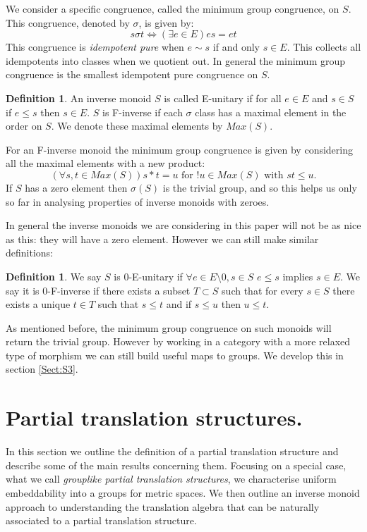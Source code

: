 \documentclass[11pt]{amsart}
\theoremstyle{plain}
\theoremstyle{definition}%
\newtheorem{definition}[theorem]{Definition}%
\theoremstyle{remark}%
\begin{document}
We consider a specific congruence, called the minimum group congruence, on $S$.  This congruence, denoted by $\sigma$, is given by:
\begin{equation*}
s \sigma t \Leftrightarrow (\exists e \in E) es = et
\end{equation*}
This congruence is \textit{idempotent pure} when $e \sim s$ if and only $s \in E$. This collects all idempotents into classes when we quotient out. In general the minimum group congruence is the smallest idempotent pure congruence on $S$. 
\begin{definition}
An inverse monoid $S$ is called E-unitary if for all $e \in E$ and $s \in S$ if $e \leq s$ then $s \in E$. $S$ is F-inverse if each $\sigma$ class has a maximal element in the order on $S$. We denote these maximal elements by $Max(S)$.
\end{definition}
For an F-inverse monoid the minimum group congruence is given by considering all the maximal elements with a new product:
\begin{equation*}
(\forall s,t \in Max(S)) s \ast t = u \mbox{ for } !u \in Max(S) \mbox{ with } st \leq u.
\end{equation*}
If $S$ has a zero element then $\sigma(S)$ is the trivial group, and so this helps us only so far in analysing properties of inverse monoids with zeroes.

In general the inverse monoids we are considering in this paper will not be as nice as this: they will have a zero element. However we can still make similar definitions:

\begin{definition}
We say $S$ is 0-E-unitary if $\forall e \in E\setminus 0, s \in S$ $e \leq s$ implies $s \in E$. We say it is 0-F-inverse if there exists a subset $T \subset S$ such that for every $s \in S$ there exists a unique $t \in T$ such that $s \leq t$ and if $s \leq u$ then $u \leq t$.
\end{definition}

As mentioned before, the minimum group congruence on such monoids will return the trivial group. However by working in a category with a more relaxed type of morphism we can still build useful maps to groups. We develop this in section \ref{Sect:S3}.

\section{Partial translation structures.}

In this section we outline the definition of a partial translation structure and describe some of the main results concerning them. Focusing on a special case, what we call \textit{grouplike partial translation structures}, we characterise uniform embeddability into a groups for metric spaces.  We then outline an inverse monoid approach to understanding the translation algebra that can be naturally associated to a partial translation structure.
\end{document}
